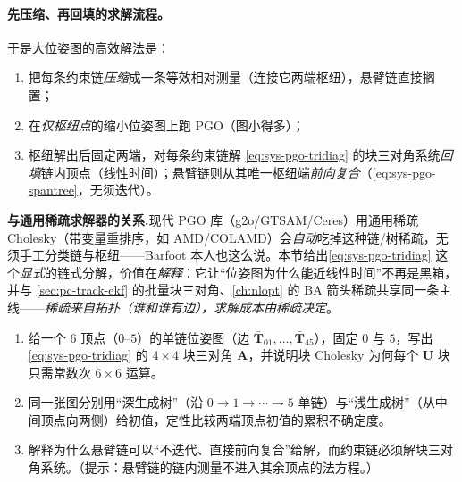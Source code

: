 \paragraph{先压缩、再回填的求解流程。}于是大位姿图的高效解法是：
\begin{enumerate}
  \item 把每条约束链\emph{压缩}成一条等效相对测量（连接它两端枢纽），悬臂链直接搁置；
  \item 在\emph{仅枢纽点}的缩小位姿图上跑 PGO（图小得多）；
  \item 枢纽解出后固定两端，对每条约束链解 \cref{eq:sys-pgo-tridiag} 的块三对角系统\emph{回填}链内顶点（线性时间）；悬臂链则从其唯一枢纽端\emph{前向复合}（\cref{eq:sys-pgo-spantree}，无须迭代）。
\end{enumerate}

\begin{note}
\textbf{与通用稀疏求解器的关系.}\;现代 PGO 库（g2o/GTSAM/Ceres）用通用稀疏 Cholesky（带变量重排序，如 AMD/COLAMD）会\emph{自动}吃掉这种链/树稀疏，无须手工分类链与枢纽——Barfoot\cite{barfoot2024state} 本人也这么说。本节给出\cref{eq:sys-pgo-tridiag} 这个\emph{显式}的链式分解，价值在\emph{解释}：它让“位姿图为什么能近线性时间”不再是黑箱，并与 \cref{sec:pc-track-ekf} 的批量块三对角、\cref{ch:nlopt} 的 BA 箭头稀疏共享同一条主线——\emph{稀疏来自拓扑（谁和谁有边），求解成本由稀疏决定}。
\end{note}

\begin{practice}[练习]
\begin{enumerate}
  \item 给一个 $6$ 顶点（$0$--$5$）的单链位姿图（边 $\bar{\mathbf{T}}_{01},\dots,\bar{\mathbf{T}}_{45}$），固定 $0$ 与 $5$，写出 \cref{eq:sys-pgo-tridiag} 的 $4\times4$ 块三对角 $\mathbf{A}$，并说明块 Cholesky 为何每个 $\mathbf{U}$ 块只需常数次 $6\times6$ 运算。
  \item 同一张图分别用“深生成树”（沿 $0\!\to\!1\!\to\!\cdots\!\to\!5$ 单链）与“浅生成树”（从中间顶点向两侧）给初值，定性比较两端顶点初值的累积不确定度。
  \item 解释为什么悬臂链可以“不迭代、直接前向复合”给解，而约束链必须解块三对角系统。（提示：悬臂链的链内测量不进入其余顶点的法方程。）
\end{enumerate}
\end{practice}

